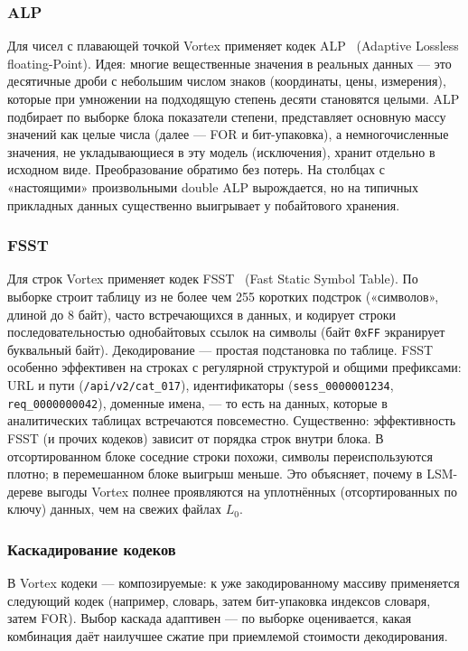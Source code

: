 \subsubsection{ALP}

Для чисел с плавающей точкой Vortex применяет кодек ALP~\cite{afroozeh2024alp}
(Adaptive Lossless floating-Point). Идея: многие вещественные значения в реальных
данных --- это десятичные дроби с небольшим числом знаков (координаты, цены,
измерения), которые при умножении на подходящую степень десяти становятся целыми.
ALP подбирает по выборке блока показатели степени, представляет основную массу
значений как целые числа (далее --- FOR и бит-упаковка), а немногочисленные значения,
не укладывающиеся в эту модель (исключения), хранит отдельно в исходном виде.
Преобразование обратимо без потерь. На столбцах с «настоящими» произвольными double
ALP вырождается, но на типичных прикладных данных существенно выигрывает у
побайтового хранения.

\subsubsection{FSST}

Для строк Vortex применяет кодек FSST~\cite{boncz2020fsst} (Fast Static Symbol
Table). По выборке строит таблицу из не более чем \num{255} коротких подстрок
(«символов», длиной до 8 байт), часто встречающихся в данных, и кодирует строки
последовательностью однобайтовых ссылок на символы (байт \texttt{0xFF} экранирует
буквальный байт). Декодирование --- простая подстановка по таблице. FSST особенно
эффективен на строках с регулярной структурой и общими префиксами: URL и пути
(\texttt{/api/v2/cat\_017}), идентификаторы (\texttt{sess\_0000001234},
\texttt{req\_0000000042}), доменные имена, --- то есть на данных, которые в
аналитических таблицах встречаются повсеместно. Существенно: эффективность FSST
(и прочих кодеков) зависит от порядка строк внутри блока. В отсортированном блоке
соседние строки похожи, символы переиспользуются плотно; в перемешанном блоке
выигрыш меньше. Это объясняет, почему в LSM-дереве выгоды Vortex полнее проявляются
на уплотнённых (отсортированных по ключу) данных, чем на свежих файлах \(L_0\).

\subsubsection{Каскадирование кодеков}

В Vortex кодеки --- композируемые: к уже закодированному массиву применяется
следующий кодек (например, словарь, затем бит-упаковка индексов словаря, затем
FOR). Выбор каскада адаптивен --- по выборке оценивается, какая комбинация даёт
наилучшее сжатие при приемлемой стоимости декодирования.

